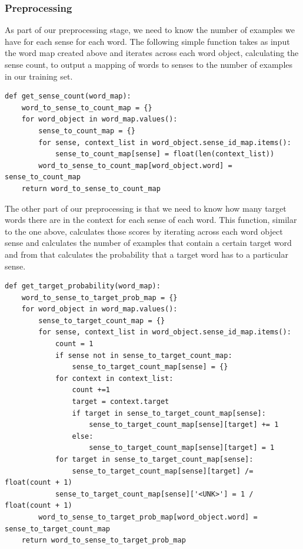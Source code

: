 \documentclass[11pt]{article}
\begin{document}
\subsubsection{Preprocessing}
As part of our preprocessing stage, we need to know the number of examples we have for each sense for each word. The following simple function takes as input the word map created above and iterates across each word object, calculating the sense count, to output a mapping of words to senses to the number of examples in our training set.

\begin{lstlisting}
def get_sense_count(word_map):
    word_to_sense_to_count_map = {}
    for word_object in word_map.values():
        sense_to_count_map = {}
        for sense, context_list in word_object.sense_id_map.items():
            sense_to_count_map[sense] = float(len(context_list))
        word_to_sense_to_count_map[word_object.word] = sense_to_count_map
    return word_to_sense_to_count_map
\end{lstlisting}

The other part of our preprocessing is that we need to know how many target words there are in the context for each sense of each word. This function, similar to the one above, calculates those scores by iterating across each word object sense and calculates the number of examples that contain a certain target word and from that calculates the probability that a target word has to a particular sense.

\begin{lstlisting}
def get_target_probability(word_map):
    word_to_sense_to_target_prob_map = {}
    for word_object in word_map.values():
        sense_to_target_count_map = {}
        for sense, context_list in word_object.sense_id_map.items():
            count = 1
            if sense not in sense_to_target_count_map:
                sense_to_target_count_map[sense] = {}
            for context in context_list:
                count +=1
                target = context.target
                if target in sense_to_target_count_map[sense]:
                    sense_to_target_count_map[sense][target] += 1
                else:
                    sense_to_target_count_map[sense][target] = 1
            for target in sense_to_target_count_map[sense]:
                sense_to_target_count_map[sense][target] /= float(count + 1)
            sense_to_target_count_map[sense]['<UNK>'] = 1 / float(count + 1)
        word_to_sense_to_target_prob_map[word_object.word] = sense_to_target_count_map
    return word_to_sense_to_target_prob_map
\end{lstlisting}
\end{document}
